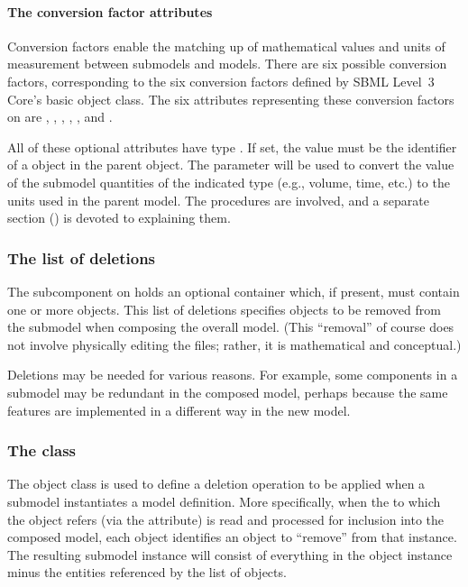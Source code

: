 \paragraph{The conversion factor attributes}
\label{submodel-conversion}

Conversion factors enable the matching up of mathematical values and
units of measurement between submodels and models.  There are six
possible conversion factors, corresponding to the six conversion factors
defined by SBML Level~3 Core's basic \Model object class.  The six
attributes representing these conversion factors on \Submodel are
, ,
, ,
, and .

All of these optional attributes have type .  If set,
the value must be the identifier of a \Parameter object in the parent
\Model object.  The parameter will be used to convert the value of the
submodel quantities of the indicated type (e.g., volume, time, etc.) to
the units used in the parent model.  The procedures are involved, and a
separate section () is devoted to explaining
them.


\subsubsection{The list of deletions}
\label{listofdeletions}

The  subcomponent on \Submodel holds an optional
\ListOfDeletions container which, if present, must contain one or more
\Deletion objects.  This list of deletions specifies objects to be
removed from the submodel when composing the overall model.  (This
``removal'' of course does not involve physically editing the files;
rather, it is mathematical and conceptual.)

Deletions may be needed for various reasons.  For example, some
components in a submodel may be redundant in the composed model, perhaps
because the same features are implemented in a different way in the
new model.


\subsubsection{The  class}
\label{deletion-class}

The \Deletion object class is used to define a deletion operation to be
applied when a submodel instantiates a model definition.  More
specifically, when the \Model to which the \Submodel object refers (via
the  attribute) is read and processed for inclusion into
the composed model, each \Deletion object identifies an object to
``remove'' from that \Model instance.  The resulting submodel instance
will consist of everything in the \Model object instance minus the
entities referenced by the list of \Deletion objects.

